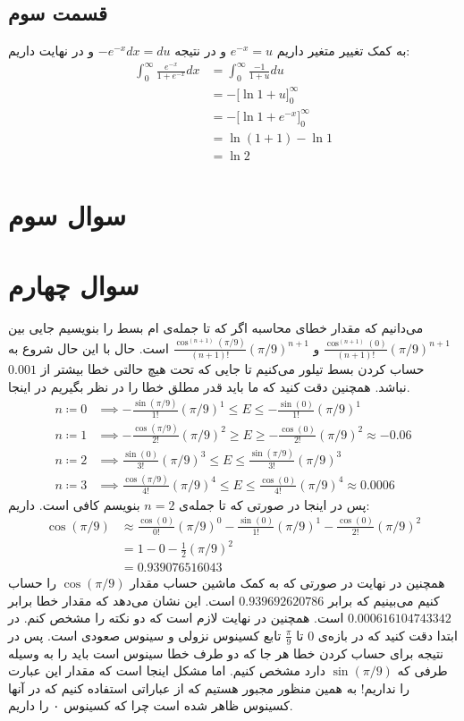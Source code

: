 \documentclass[]{article}
\begin{document}
\subsection*{قسمت سوم}
به کمک تغییر متغیر داریم
$e^{-x} = u$
و در نتیجه
$-e^{-x} dx = du$
و در نهایت داریم:
\begin{align*}
    \int_{0}^{\infty} \frac{e^{-x}}{1+e^{-x}} dx &= \int_{0}^{\infty} \frac{-1}{1+u} du\\
    &= -\Big[\ln 1 + u\Big]_{0}^{\infty}\\
    &= -\Big[\ln 1 + e^{-x}\Big]_{0}^{\infty}\\
    &= \ln (1 + 1) - \ln 1\\
    &= \boxed{\ln 2}
\end{align*}
\section*{سوال سوم}
\section*{سوال چهارم}
می‌دانیم که مقدار خطای محاسبه اگر که تا جمله‌ی
ام
بسط را بنویسیم جایی بین
$\frac{\cos^{(n+1)}(0)}{(n+1)!}(\pi / 9)^{n+1}$ و $\frac{\cos^{(n+1)}(\pi / 9)}{(n+1)!}(\pi / 9)^{n+1}$
است. حال با این حال شروع به حساب کردن بسط تیلور می‌کنیم تا جایی که تحت هیچ حالتی خطا بیشتر از
$0.001$
نباشد. همچنین دقت کنید که ما باید قدر مطلق خطا را در نظر بگیریم در اینجا.
\begin{align*}
    n \coloneqq 0 &\implies -\frac{\sin(\pi / 9)}{1!}(\pi / 9)^{1} \leq E \leq -\frac{\sin(0)}{1!}(\pi / 9)^{1}\\
    n \coloneqq 1 &\implies -\frac{\cos(\pi / 9)}{2!}(\pi / 9)^2 \geq E \geq -\frac{\cos(0)}{2!}(\pi / 9)^{2} \approx -0.06\\
    n \coloneqq 2 &\implies \frac{\sin(0)}{3!}(\pi / 9)^3 \leq E \leq \frac{\sin(\pi / 9)}{3!}(\pi / 9)^{3}\\
    n \coloneqq 3 &\implies \frac{\cos(\pi / 9)}{4!}(\pi / 9)^{4} \leq E \leq \frac{\cos(0)}{4!}(\pi / 9)^4 \approx 0.0006
\end{align*}
پس در اینجا در صورتی که تا جمله‌ی
$n=2$
بنویسم کافی است. داریم:
\begin{align*}
    \cos(\pi/9) &\approx \frac{\cos(0)}{0!}(\pi / 9)^{0} - \frac{\sin(0)}{1!}(\pi / 9)^{1} - \frac{\cos(0)}{2!}(\pi / 9)^{2}\\
    &= 1 - 0 - \frac{1}{2}(\pi / 9)^{2}\\
    &= 0.939076516043
\end{align*}
همچنین در نهایت در صورتی که به کمک ماشین حساب مقدار
$\cos(\pi/9)$
را حساب کنیم می‌بینیم که برابر
$0.939692620786$
است. این نشان می‌دهد که مقدار خطا برابر
$0.000616104743342$
است. همچنین در نهایت لازم است که دو نکته را مشخص کنم. در ابتدا دقت کنید که در بازه‌ی
$0$ تا $\frac{\pi}{9}$
تابع کسینوس نزولی و سینوس صعودی است. پس در نتیجه برای حساب کردن
خطا هر جا که دو طرف خطا سینوس است باید
را به وسیله طرفی که
$\sin(\pi / 9)$
دارد مشخص کنیم. اما مشکل اینجا است که مقدار این عبارت را نداریم! به همین منظور مجبور هستیم که
از عباراتی استفاده کنیم که در آنها کسینوس ظاهر شده است چرا که کسینوس ۰ را داریم.
\end{document}
